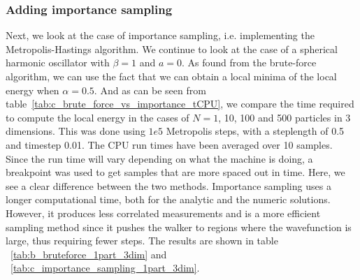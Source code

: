 \documentclass[
    a4paper, aps, twocolumn, floatfix, superscriptaddress,
    nofootinbib]{revtex4-1}
\begin{document}
\subsubsection{Adding importance sampling}
Next, we look at the case of importance sampling, i.e. implementing the Metropolis-Hastings algorithm. We continue to look at the case of a spherical harmonic oscillator with $\beta=1$ and $a=0$. As found from the brute-force algorithm, we can use the fact that we can obtain a local minima of the local energy when $\alpha = 0.5$. And as can be seen from table~\ref{tab:c_brute_force_vs_importance_tCPU}, we compare the time required to compute the local energy in the cases of $N=1$, 10, 100 and 500 particles in 3 dimensions. This was done using $1e5$ Metropolis steps, with a steplength of 0.5 and timestep 0.01. The CPU run times have been averaged over 10 samples. Since the run time will vary depending on what the machine is doing, a breakpoint was used to get samples that are more spaced out in time. Here, we see a clear difference between the two methods. Importance sampling uses a longer computational time, both for the analytic and the numeric solutions. 
However, it produces less correlated measurements and is a more efficient sampling method since it pushes the walker to regions where the wavefunction is large, thus requiring fewer steps. The results are shown in table ~\ref{tab:b_bruteforce_1part_3dim} and ~\ref{tab:c_importance_sampling_1part_3dim}. 
\end{document}

